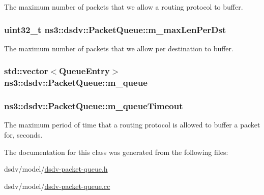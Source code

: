 The maximum number of packets that we allow a routing protocol to buffer. 

\subsubsection[{\texorpdfstring{m\+\_\+max\+Len\+Per\+Dst}{m_maxLenPerDst}}]{\setlength{\rightskip}{0pt plus 5cm}uint32\+\_\+t ns3\+::dsdv\+::\+Packet\+Queue\+::m\+\_\+max\+Len\+Per\+Dst\hspace{0.3cm}{\ttfamily [private]}}\hypertarget{classns3_1_1dsdv_1_1PacketQueue_aae4d9a76d9a8e6ecfd833d77bd77b0ef}{}\label{classns3_1_1dsdv_1_1PacketQueue_aae4d9a76d9a8e6ecfd833d77bd77b0ef}


The maximum number of packets that we allow per destination to buffer. 

\subsubsection[{\texorpdfstring{m\+\_\+queue}{m_queue}}]{\setlength{\rightskip}{0pt plus 5cm}std\+::vector$<${\bf Queue\+Entry}$>$ ns3\+::dsdv\+::\+Packet\+Queue\+::m\+\_\+queue\hspace{0.3cm}{\ttfamily [private]}}\hypertarget{classns3_1_1dsdv_1_1PacketQueue_a1388a88f87f1d1fbe7df390697621ebd}{}\label{classns3_1_1dsdv_1_1PacketQueue_a1388a88f87f1d1fbe7df390697621ebd}
\subsubsection[{\texorpdfstring{m\+\_\+queue\+Timeout}{m_queueTimeout}}]{ ns3\+::dsdv\+::\+Packet\+Queue\+::m\+\_\+queue\+Timeout\hspace{0.3cm}{\ttfamily [private]}}\hypertarget{classns3_1_1dsdv_1_1PacketQueue_af39d729c48cb48eeddb07f90f4b5ed2f}{}\label{classns3_1_1dsdv_1_1PacketQueue_af39d729c48cb48eeddb07f90f4b5ed2f}


The maximum period of time that a routing protocol is allowed to buffer a packet for, seconds. 



The documentation for this class was generated from the following files\+:\begin{DoxyCompactItemize}
\item 
dsdv/model/\hyperlink{dsdv-packet-queue_8h}{dsdv-\/packet-\/queue.\+h}\item 
dsdv/model/\hyperlink{dsdv-packet-queue_8cc}{dsdv-\/packet-\/queue.\+cc}\end{DoxyCompactItemize}
